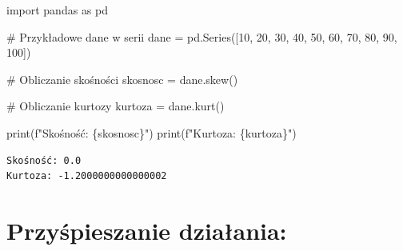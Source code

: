 \documentclass[
  polish,
  letterpaper,
  DIV=11,
  numbers=noendperiod]{scrreprt}
\newenvironment{Shaded}{\begin{snugshade}}{\end{snugshade}}
\newcommand{\BuiltInTok}[1]{\textcolor[rgb]{0.00,0.23,0.31}{#1}}
\newcommand{\CommentTok}[1]{\textcolor[rgb]{0.37,0.37,0.37}{#1}}
\newcommand{\DecValTok}[1]{\textcolor[rgb]{0.68,0.00,0.00}{#1}}
\newcommand{\ImportTok}[1]{\textcolor[rgb]{0.00,0.46,0.62}{#1}}
\newcommand{\NormalTok}[1]{\textcolor[rgb]{0.00,0.23,0.31}{#1}}
\newcommand{\OperatorTok}[1]{\textcolor[rgb]{0.37,0.37,0.37}{#1}}
\newcommand{\SpecialCharTok}[1]{\textcolor[rgb]{0.37,0.37,0.37}{#1}}
\newcommand{\SpecialStringTok}[1]{\textcolor[rgb]{0.13,0.47,0.30}{#1}}
\begin{document}
\begin{Shaded}
\begin{Highlighting}[]
\ImportTok{import}\NormalTok{ pandas }\ImportTok{as}\NormalTok{ pd}

\CommentTok{\# Przykładowe dane w serii}
\NormalTok{dane }\OperatorTok{=}\NormalTok{ pd.Series([}\DecValTok{10}\NormalTok{, }\DecValTok{20}\NormalTok{, }\DecValTok{30}\NormalTok{, }\DecValTok{40}\NormalTok{, }\DecValTok{50}\NormalTok{, }\DecValTok{60}\NormalTok{, }\DecValTok{70}\NormalTok{, }\DecValTok{80}\NormalTok{, }\DecValTok{90}\NormalTok{, }\DecValTok{100}\NormalTok{])}

\CommentTok{\# Obliczanie skośności}
\NormalTok{skosnosc }\OperatorTok{=}\NormalTok{ dane.skew()}

\CommentTok{\# Obliczanie kurtozy}
\NormalTok{kurtoza }\OperatorTok{=}\NormalTok{ dane.kurt()}

\BuiltInTok{print}\NormalTok{(}\SpecialStringTok{f"Skośność: }\SpecialCharTok{\{}\NormalTok{skosnosc}\SpecialCharTok{\}}\SpecialStringTok{"}\NormalTok{)}
\BuiltInTok{print}\NormalTok{(}\SpecialStringTok{f"Kurtoza: }\SpecialCharTok{\{}\NormalTok{kurtoza}\SpecialCharTok{\}}\SpecialStringTok{"}\NormalTok{)}
\end{Highlighting}
\end{Shaded}

\begin{verbatim}
Skośność: 0.0
Kurtoza: -1.2000000000000002
\end{verbatim}

\section{Przyśpieszanie
działania:}\label{przyux15bpieszanie-dziaux142ania}
\end{document}
